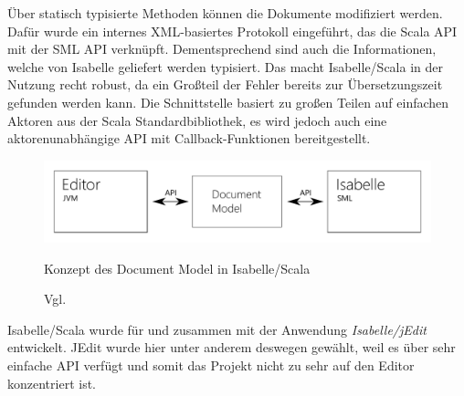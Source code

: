 Über statisch typisierte Methoden können die Dokumente modifiziert werden. Dafür wurde ein internes
XML-basiertes Protokoll eingeführt, das die Scala API mit der SML API verknüpft. Dementsprechend
sind auch die Informationen, welche von Isabelle geliefert werden typisiert. Das macht
Isabelle/Scala in der Nutzung recht robust, da ein Großteil der Fehler bereits zur Übersetzungszeit
gefunden werden kann. Die Schnittstelle basiert zu großen Teilen auf einfachen Aktoren aus der Scala
Standardbibliothek, es wird jedoch auch eine aktorenunabhängige API mit Callback-Funktionen
bereitgestellt.

\begin{figure}[ht]
\includegraphics[width=\linewidth]{images/diagram-iscala}
  \caption{Konzept des Document Model in Isabelle/Scala}
  \caption*{Vgl. \cite{iscala}}
  \label{fig:diagram-iscala}
\end{figure}

Isabelle/Scala wurde für und zusammen mit der Anwendung \textit{Isabelle/jEdit} entwickelt. JEdit
wurde hier unter anderem deswegen gewählt, weil es über sehr einfache API verfügt und somit das
Projekt nicht zu sehr auf den Editor konzentriert ist.